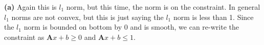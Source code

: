 \documentclass[12pt]{article}
\newcommand{\matr}[1]{\mathbf{#1}}
\newenvironment{problem}[2][Problem]{\begin{trivlist}
\item[\hskip \labelsep {\bfseries #1}\hskip \labelsep {\bfseries #2.}]}{\end{trivlist}}
\newenvironment{subproblem}[1]{\textbf{(#1)}}{}
\theoremstyle{definition}
\begin{document}
\begin{problem}{7}
\begin{subproblem}{a}
Again this is $l_1$ norm, but this time, the norm is on the constraint.
In general $l_1$ norms are not convex, but this is just saying the $l_1$ norm is less than 1.
Since the $l_1$ norm is bounded on bottom by $0$ and is smooth, we can re-write the constraint as
$\matr{A}x+b \geq 0$ and $\matr{A}x+b \leq 1$.
\end{subproblem}

\end{problem}
\end{document}
